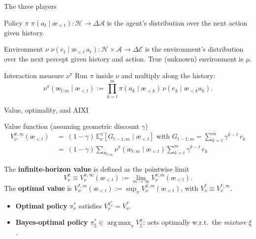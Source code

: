 \documentclass[10pt,aspectratio=169]{beamer}
\newcommand{\cA}{\mathcal{A}}
\newcommand{\cE}{\mathcal{E}}
\newcommand{\cH}{\mathcal{H}}
\newcommand{\Ex}{\mathbb{E}}
\DeclareMathOperator*{\argmax}{arg\,max}
\newcommand{\aes}{{\text{\ae}}}            %
\begin{document}
\begin{frame}{The three players}
\begin{block}{Policy $\pi$}
$\pi(a_t \mid \aes_{<t}) : \cH \to \Delta \cA$  is the agent's distribution over the next action given history.
\end{block}
\pause
\begin{block}{Environment $\nu$}
$\nu(e_t \mid \aes_{<t}\, a_t) : \cH \times \cA \to \Delta \cE$ is the environment's distribution over the next percept given history and action. 
True (unknown) environment is $\mu$.
\end{block}
\pause
\begin{block}{Interaction measure $\nu^\pi$}
Run $\pi$ inside $\nu$ and multiply along the history:
\[
\nu^\pi(\aes_{t:m} \mid \aes_{<t}) := \prod_{k=t}^m \pi(a_k\mid \aes_{<k})\,\nu(e_k\mid \aes_{<k}a_k).
\]
\end{block}
\end{frame}

\begin{frame}{Value, optimality, and AIXI}
\begin{block}{Value function (assuming geometric discount $\gamma$)}
\vspace{-0.3cm}
\begin{align*}
V_\nu^{\pi,m}(\aes_{<t})
~&=~ (1-\gamma)\, {\Ex_\nu^\pi} [G_{t-1:m} \mid \aes_{<t}] \text{ with } G_{t-1:m} = \sum_{k=t}^{m} \gamma^{k-t}\, r_k \\
~&=~ (1-\gamma) \sum_{\aes_{t:m}} \nu^\pi(\aes_{t:m} \mid \aes_{<t}) \sum_{k=t}^{m} \gamma^{k-t}\, r_k 
\end{align*}
\end{block}
\pause
The \textbf{infinite-horizon value} is defined as the pointwise limit 
$$
V_\nu^\pi \equiv  V_\nu^{\pi,\infty}(\aes_{<t}) := \lim_{m \to \infty} V_\nu^{\pi,m}(\aes_{<t}).
$$
\pause
The \textbf{optimal value} is $V_\nu^{*,m}(\aes_{<t}) := \sup_\pi V_\nu^{\pi,m}(\aes_{<t})$, with $V_\nu^* \equiv V_\nu^{*,\infty}$.%
\pause
\begin{itemize}
    \item \textbf{Optimal policy} $\pi_\nu^*$ satisfies $V_\nu^{\pi_\nu^*} = V_\nu^*$.
    \item \textbf{Bayes-optimal policy} $\pi_\xi^* \in \argmax_\pi V_\xi^\pi$: acts optimally w.r.t.\ the \emph{mixture} $\xi$.
\end{itemize}
\end{frame}
\end{document}
